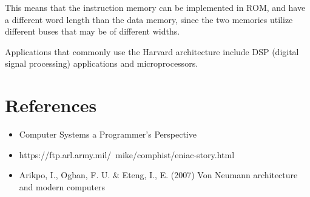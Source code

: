 This means that the instruction memory can be implemented in ROM, and have a different word length than the data memory, since the two memories utilize different buses that may be of different widths.

Applications that commonly use the Harvard architecture include DSP (digital signal processing) applications and microprocessors.

\section{References}

\begin{itemize}
	\item Computer Systems a Programmer's Perspective
	\item https://ftp.arl.army.mil/~mike/comphist/eniac-story.html
	\item Arikpo, I., Ogban, F. U. \& Eteng, I., E. (2007) Von Neumann architecture and modern computers
\end{itemize}